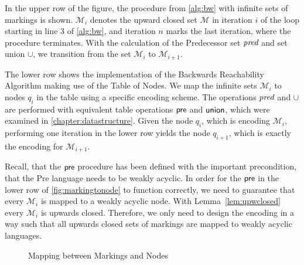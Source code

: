 In the upper row of the figure, the procedure from \autoref{alg:bw} with infinite sets of markings is shown. 
$\mathcal{M}_{i}$ denotes the upward closed set $\mathcal{M}$ in iteration $i$ of the loop starting in line 3 of \autoref{alg:bw}, and iteration $n$ marks the last iteration, where the procedure terminates. With the calculation of the Predecessor set $\operatorname{\textit{pred}}$ and set union $\cup$, we transition from the set $\mathcal{M}_{i}$  to $\mathcal{M}_{i+1}$.

\par 

The lower row shows the implementation of the Backwards Reachability Algorithm making use of the Table of Nodes. We map the infinite sets $\mathcal{M}_{i}$ to nodes $q_{i}$ in the table using a specific encoding scheme. The operations $\operatorname{\textit{pred}}$ and $\cup$ are performed with equivalent table operations $\operatorname{\textsf{pre}}$ and $\operatorname{\textsf{union}}$, which were examined in \autoref{chapter:datastructure}.
Given the node $q_{i}$, which is encoding $\mathcal{M}_{i}$, performing one iteration in the lower row yields the node $q_{i+1}$, which is exactly the encoding for $\mathcal{M}_{i+1}$.

Recall, that the $\operatorname{\textsf{pre}}$ procedure has been defined with the important precondition, that the Pre language needs to be weakly acyclic. In order for the $\operatorname{\textsf{pre}}$ in the lower row of \autoref{fig:markingtonode} to function correctly, we need to guarantee that every $\mathcal{M}_{i}$ is mapped to a weakly acyclic node. With Lemma~\autoref{lem:upwclosed} every $\mathcal{M}_{i}$ is upwards closed. Therefore, we only need to design the encoding in a way such that all upwards closed sets of markings are mapped to weakly acyclic languages.

\begin{figure}[htb]
\centering
\caption{Mapping between Markings and Nodes}\label{fig:markingtonode}
\end{figure}

